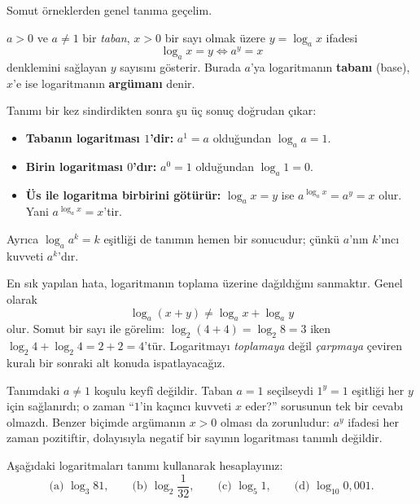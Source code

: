 Somut örneklerden genel tanıma geçelim.

\begin{definition}[Logaritma]
$a > 0$ ve $a \neq 1$ bir \emph{taban}, $x > 0$ bir sayı olmak üzere $y = \log_a x$ ifadesi
\[
\log_a x = y \iff a^y = x
\]
denklemini sağlayan $y$ sayısını gösterir. Burada $a$'ya logaritmanın \textbf{tabanı} (base), $x$'e ise logaritmanın \textbf{argümanı} denir.
\end{definition}

Tanımı bir kez sindirdikten sonra şu üç sonuç doğrudan çıkar:

\begin{itemize}
    \item \textbf{Tabanın logaritması $1$'dir:} $a^1 = a$ olduğundan $\log_a a = 1$.
    \item \textbf{Birin logaritması $0$'dır:} $a^0 = 1$ olduğundan $\log_a 1 = 0$.
    \item \textbf{Üs ile logaritma birbirini götürür:} $\log_a x = y$ ise $a^{\log_a x} = a^y = x$ olur. Yani $a^{\log_a x} = x$'tir.
\end{itemize}

Ayrıca $\log_a a^k = k$ eşitliği de tanımın hemen bir sonucudur; çünkü $a$'nın $k$'ıncı kuvveti $a^k$'dır.

\begin{caution}
En sık yapılan hata, logaritmanın toplama üzerine dağıldığını sanmaktır. Genel olarak
\[
\log_a (x + y) \neq \log_a x + \log_a y
\]
olur. Somut bir sayı ile görelim: $\log_2 (4 + 4) = \log_2 8 = 3$ iken $\log_2 4 + \log_2 4 = 2 + 2 = 4$'tür. Logaritmayı \emph{toplamaya} değil \emph{çarpmaya} çeviren kuralı bir sonraki alt konuda ispatlayacağız.
\end{caution}

\begin{remark}
Tanımdaki $a \neq 1$ koşulu keyfî değildir. Taban $a = 1$ seçilseydi $1^y = 1$ eşitliği her $y$ için sağlanırdı; o zaman ``$1$'in kaçıncı kuvveti $x$ eder?'' sorusunun tek bir cevabı olmazdı. Benzer biçimde argümanın $x > 0$ olması da zorunludur: $a^y$ ifadesi her zaman pozitiftir, dolayısıyla negatif bir sayının logaritması tanımlı değildir.
\end{remark}

\begin{example}
Aşağıdaki logaritmaları tanımı kullanarak hesaplayınız:
\[
\text{(a) } \log_3 81, \qquad \text{(b) } \log_2 \frac{1}{32}, \qquad \text{(c) } \log_5 1, \qquad \text{(d) } \log_{10} 0{,}001.
\]
\end{example}

